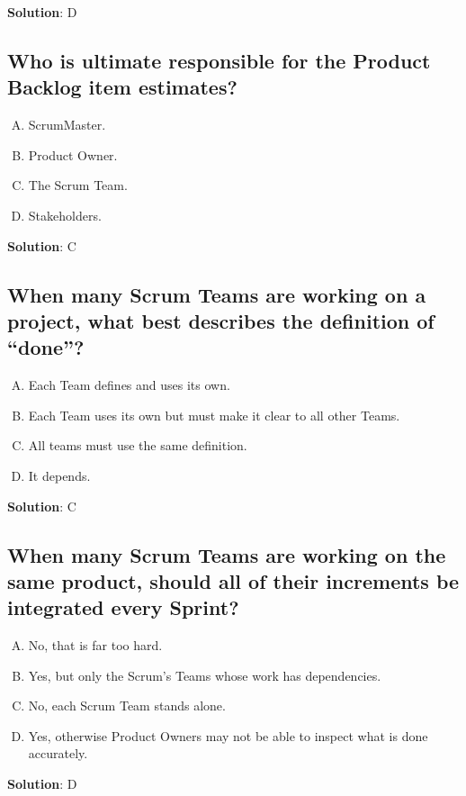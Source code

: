 \textbf{Solution}: D


\subsection{Who is ultimate responsible for the Product Backlog item estimates?}

\begin{enumerate}[A)]
  \item ScrumMaster.
  \item Product Owner.
  \item The Scrum Team.
  \item Stakeholders.
\end{enumerate}


\textbf{Solution}: C


\subsection{When many Scrum Teams are working on a project, what best describes the definition of \enquote{done}?}

\begin{enumerate}[A)]
  \item Each Team defines and uses its own.
  \item Each Team uses its own but must make it clear to all other Teams.
  \item All teams must use the same definition.
  \item It depends.
\end{enumerate}


\textbf{Solution}: C


\subsection{When many Scrum Teams are working on the same product, should all of their increments be integrated every Sprint?}

\begin{enumerate}[A)]
  \item No, that is far too hard.
  \item Yes, but only the Scrum's Teams whose work has dependencies.
  \item No, each Scrum Team stands alone.
  \item Yes, otherwise Product Owners may not be able to inspect what is done accurately.
\end{enumerate}


\textbf{Solution}: D


